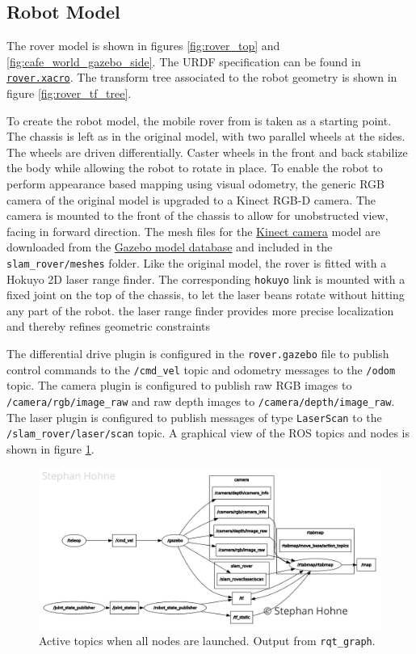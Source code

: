 \documentclass[10pt, journal, compsoc]{IEEEtran}
\begin{document}
\subsection{Robot Model}
\label{sec:robot_model}
The rover model is shown in figures \ref{fig:rover_top} and \ref{fig:cafe_world_gazebo_side}. The URDF specification can be found in \href{https://github.com/S2H-Mobile/RoboND-SLAM-Project/blob/master/slam_rover/urdf/rover.xacro}{\texttt{rover.xacro}}. The transform tree associated to the robot geometry is shown in figure \ref{fig:rover_tf_tree}.

To create the robot model, the mobile rover from \cite{where_am_i} is taken as a starting point. The chassis is left as in the original model, with two parallel wheels at the sides. The wheels are driven differentially. Caster wheels in the front and back stabilize the body while allowing the robot to rotate in place. To enable the robot to perform appearance based mapping using visual odometry, the generic RGB camera of the original model is upgraded to a Kinect RGB-D camera. The camera is mounted to the front of the chassis to allow for unobstructed view, facing in forward direction. The mesh files for the \href{http://models.gazebosim.org/kinect/}{Kinect camera} model are downloaded from the \href{https://bitbucket.org/osrf/gazebo_models/downloads/}{Gazebo model database} and included in the \texttt{slam\_rover/meshes} folder.  Like the original model, the rover is fitted with a Hokuyo 2D laser range finder. The corresponding \texttt{hokuyo} link is mounted with a fixed joint on the top of the chassis, to let the laser beans rotate without hitting any part of the robot.
the laser range finder provides more precise localization and thereby refines geometric constraints

The differential drive plugin is configured in the \texttt{rover.gazebo} file to publish control commands to the \texttt{/cmd\_vel} topic and odometry messages to the \texttt{/odom} topic. The camera plugin is configured to publish raw RGB images to \texttt{/camera/rgb/image\_raw} and raw depth images to \texttt{/camera/depth/image\_raw}. The laser plugin is configured to publish messages of type \texttt{LaserScan} to the \texttt{/slam\_rover/laser/scan} topic. A graphical view of the ROS topics and nodes is shown in figure \ref{fig:rqt_graph}.

\begin{figure}[thpb]
      \centering
      \includegraphics[width=\textwidth]{images/rqt_graph.jpg}
      \caption{Active topics when all nodes are launched. Output from \texttt{rqt\_graph}.}
      \label{fig:rqt_graph}
\end{figure}
\end{document}
